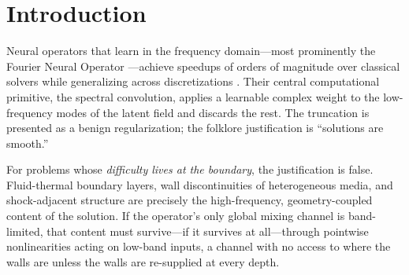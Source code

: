 \documentclass[11pt]{article}
\theoremstyle{definition}
\newcommand{\fno}{\textsc{fno}}
\newcommand{\agfno}{\textsc{agf-no}}
\newcommand{\Rtwo}{R^2}
\begin{document}
\begin{abstract}
The collapse replicates: a three-seed re-run of the sweep reproduces it with a
$\SweepFnoAgfSixteenRatio\times$ error gap and zero overlap across seeds.
It also lifts: on 3-D obstacle Darcy (spheres and solid tori, multiply
connected, float64 ground truth) the same collapse--plateau pair reappears
at depth 16 (\fno{} \ThreeDDSixteenFnoRelL{} vs.\ \agfno{}
\ThreeDDSixteenAgfnoRelL{}; probe $\Rtwo$ \ThreeDDSixteenFnoProbe{} vs.\
\ThreeDDSixteenAgfnoProbe{}), establishing the phenomenon as
dimension-independent.
We also locate the mechanism's boundary honestly: on a second PDE family
(advection--diffusion past fixed-temperature obstacles) whose difficulty is
not wall-anchored, the same architecture with the same control shows only a
\PtwoMechGainTRed{} effect---a near-null result we report and hypothesize
about, not hide. Code, checkpoints, per-seed results, and one-click GPU
reruns are public.
\end{abstract}

\section{Introduction}
\label{sec:intro}

Neural operators that learn in the frequency domain---most prominently the
Fourier Neural Operator \citep{li2021fno}---achieve speedups of orders of
magnitude over classical solvers while generalizing across discretizations
\citep{brandstetter2022message, takamoto2022pdebench}. Their central
computational primitive, the spectral convolution, applies a learnable
complex weight to the low-frequency modes of the latent field and discards
the rest. The truncation is presented as a benign regularization; the
folklore justification is ``solutions are smooth.''

For problems whose \emph{difficulty lives at the boundary}, the justification
is false. Fluid-thermal boundary layers, wall discontinuities of heterogeneous
media, and shock-adjacent structure are precisely the high-frequency,
geometry-coupled content of the solution. If the operator's only global
mixing channel is band-limited, that content must survive---if it survives at
all---through pointwise nonlinearities acting on low-band inputs, a channel
with no access to where the walls are unless the walls are re-supplied at
every depth.
\end{document}
